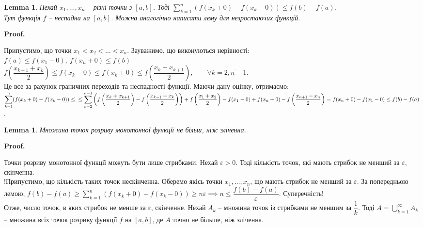 \documentclass[a4paper, 10pt]{article}
\makeatletter
\theoremstyle{theoremdd}
\theoremstyle{theoremdd}
\theoremstyle{theoremdd}
\theoremstyle{theoremdd}
\theoremstyle{theoremdd}
\theoremstyle{theoremdd}
\theoremstyle{theoremdd}
\theoremstyle{theoremdd}
\newtheorem{lemma}[theorem]{Lemma}
\theoremstyle{theoremdd}
\renewenvironment{proof}[1][Proof.\\]{\par
\pushQED{\hfill \qed}%
\normalfont \topsep6\p@\@plus6\p@\relax
\trivlist
\item\relax
{\bfseries
#1\@addpunct{.}}\hspace\labelsep\ignorespaces
}{%
\popQED\endtrivlist\@endpefalse
}
\makeatother
\begin{document}
\begin{lemma}
\label{sum_of_jump_estimation}
Нехай $x_1,\dots,x_n$ -- різні точки з $[a,b]$. Тоді $\displaystyle\sum_{k=1}^n (f(x_k+0) - f(x_k-0)) \leq f(b) - f(a)$.\\
Тут функція $f$ -- неспадна на $[a,b]$. Можна аналогічно написати лему для незростаючих функцій.
\end{lemma}

\begin{proof}
Припустимо, що точки $x_1 < x_2 < \dots < x_n$. Зауважимо, що виконуються нерівності:\\
$f(a) \leq f(x_1-0),\ f(x_n+0) \leq f(b)$\\
$f\left( \dfrac{x_{k-1} + x_k}{2} \right) \leq f(x_k-0) \leq f(x_k+0) \leq f\left( \dfrac{x_k+x_{k+1}}{2} \right),\qquad \forall k = \overline{2,n-1}$.\\
Це все за рахунок граничних переходів та неспадності функції. Маючи дану оцінку, отримаємо:\\
$\displaystyle\sum_{k=1}^n (f(x_k+0) - f(x_k-0)) \leq \\ \leq \sum_{k=2}^{n-1} \left( f\left( \dfrac{x_k + x_{k+1}}{2}\right) - f\left( \dfrac{x_{k-1} + x_k}{2} \right) \right) + f\left( \dfrac{x_1+x_2}{2}\right) - f(x_1-0) + f(x_n+0) - f\left( \dfrac{x_{n+1}-x_n}{2}\right) = f(x_n+0) - f(x_1-0) \leq f(b) - f(a)$.
\end{proof}

\begin{lemma}
Множина точок розриву монотонної функції не більш, ніж зліченна.
\end{lemma}

\begin{proof}
Точки розриву монотонної функції можуть бути лише стрибками. Нехай $\varepsilon > 0$. Тоді кількість точок, які мають стрибок не менший за $\varepsilon$, скінченна.\\
!Припустимо, що кількість таких точок нескінченна. Оберемо якісь точки $x_1,\dots,x_n$, що мають стрибок не менший за $\varepsilon$. За попередньою лемою, $f(b) - f(a) \geq \displaystyle\sum_{k=1}^n (f(x_k+0) - f(x_k-0)) \geq n \varepsilon \implies n \leq \dfrac{f(b)-f(a)}{\varepsilon}$. Суперечність!\\
Отже, число точок, в яких стрибок не менше за $\varepsilon$, скінченне. Нехай $A_k$ -- множина точок із стрибками не меншим за $\dfrac{1}{k}$. Тоді $A = \displaystyle\bigcup_{k = 1}^\infty A_k$ -- множина всіх точок розриву функції $f$ на $[a,b]$, де $A$ точно не більше, ніж зліченна.
\end{proof}
\end{document}
